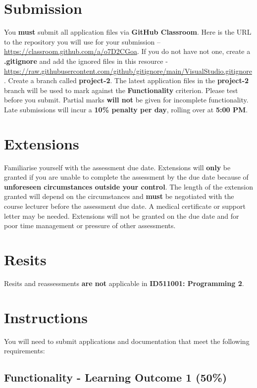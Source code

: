 \documentclass{article}
\begin{document}
\section*{Submission}
You \textbf{must} submit all application files via \textbf{GitHub Classroom}. Here is the URL to the repository you will use for your submission – \href{https://classroom.github.com/a/o7D2CGoa}{https://classroom.github.com/a/o7D2CGoa}. If you do not have not one, create a \textbf{.gitignore} and add the ignored files in this resource - \href{https://raw.githubusercontent.com/github/gitignore/main/VisualStudio.gitignore}{https://raw.githubusercontent.com/github/gitignore/main/VisualStudio.gitignore}. Create a branch called \textbf{project-2}. The latest application files in the \textbf{project-2} branch will be used to mark against the \textbf{Functionality} criterion. Please test before you submit. Partial marks \textbf{will not} be given for incomplete functionality. Late submissions will incur a \textbf{10\% penalty per day}, rolling over at \textbf{5:00 PM}.

\section*{Extensions}
Familiarise yourself with the assessment due date. Extensions will \textbf{only} be granted if you are unable to complete the assessment by the due date because of \textbf{unforeseen circumstances outside your control}. The length of the extension granted will depend on the circumstances and \textbf{must} be negotiated with the course lecturer before the assessment due date. A medical certificate or support letter may be needed. Extensions will not be granted on the due date and for poor time management or pressure of other assessments.

\section*{Resits}
Resits and reassessments \textbf{are not} applicable in \textbf{ID511001: Programming 2}.

\section*{Instructions}
You will need to submit applications and documentation that meet the following requirements:\\

\subsection*{Functionality - Learning Outcome 1 (50\%)}
\end{document}
